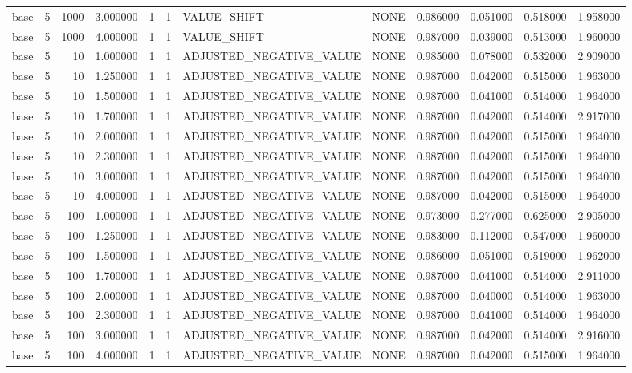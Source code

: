 \begin{tabular}{lrrrllllrrrr}
base & 5 & 1000 & 3.000000 & 1 & 1 & VALUE_SHIFT & NONE & 0.986000 & 0.051000 & 0.518000 & 1.958000 \\
base & 5 & 1000 & 4.000000 & 1 & 1 & VALUE_SHIFT & NONE & 0.987000 & 0.039000 & 0.513000 & 1.960000 \\
base & 5 & 10 & 1.000000 & 1 & 1 & ADJUSTED_NEGATIVE_VALUE & NONE & 0.985000 & 0.078000 & 0.532000 & 2.909000 \\
base & 5 & 10 & 1.250000 & 1 & 1 & ADJUSTED_NEGATIVE_VALUE & NONE & 0.987000 & 0.042000 & 0.515000 & 1.963000 \\
base & 5 & 10 & 1.500000 & 1 & 1 & ADJUSTED_NEGATIVE_VALUE & NONE & 0.987000 & 0.041000 & 0.514000 & 1.964000 \\
base & 5 & 10 & 1.700000 & 1 & 1 & ADJUSTED_NEGATIVE_VALUE & NONE & 0.987000 & 0.042000 & 0.514000 & 2.917000 \\
base & 5 & 10 & 2.000000 & 1 & 1 & ADJUSTED_NEGATIVE_VALUE & NONE & 0.987000 & 0.042000 & 0.515000 & 1.964000 \\
base & 5 & 10 & 2.300000 & 1 & 1 & ADJUSTED_NEGATIVE_VALUE & NONE & 0.987000 & 0.042000 & 0.515000 & 1.964000 \\
base & 5 & 10 & 3.000000 & 1 & 1 & ADJUSTED_NEGATIVE_VALUE & NONE & 0.987000 & 0.042000 & 0.515000 & 1.964000 \\
base & 5 & 10 & 4.000000 & 1 & 1 & ADJUSTED_NEGATIVE_VALUE & NONE & 0.987000 & 0.042000 & 0.515000 & 1.964000 \\
base & 5 & 100 & 1.000000 & 1 & 1 & ADJUSTED_NEGATIVE_VALUE & NONE & 0.973000 & 0.277000 & 0.625000 & 2.905000 \\
base & 5 & 100 & 1.250000 & 1 & 1 & ADJUSTED_NEGATIVE_VALUE & NONE & 0.983000 & 0.112000 & 0.547000 & 1.960000 \\
base & 5 & 100 & 1.500000 & 1 & 1 & ADJUSTED_NEGATIVE_VALUE & NONE & 0.986000 & 0.051000 & 0.519000 & 1.962000 \\
base & 5 & 100 & 1.700000 & 1 & 1 & ADJUSTED_NEGATIVE_VALUE & NONE & 0.987000 & 0.041000 & 0.514000 & 2.911000 \\
base & 5 & 100 & 2.000000 & 1 & 1 & ADJUSTED_NEGATIVE_VALUE & NONE & 0.987000 & 0.040000 & 0.514000 & 1.963000 \\
base & 5 & 100 & 2.300000 & 1 & 1 & ADJUSTED_NEGATIVE_VALUE & NONE & 0.987000 & 0.041000 & 0.514000 & 1.964000 \\
base & 5 & 100 & 3.000000 & 1 & 1 & ADJUSTED_NEGATIVE_VALUE & NONE & 0.987000 & 0.042000 & 0.514000 & 2.916000 \\
base & 5 & 100 & 4.000000 & 1 & 1 & ADJUSTED_NEGATIVE_VALUE & NONE & 0.987000 & 0.042000 & 0.515000 & 1.964000 \\

\end{tabular}
